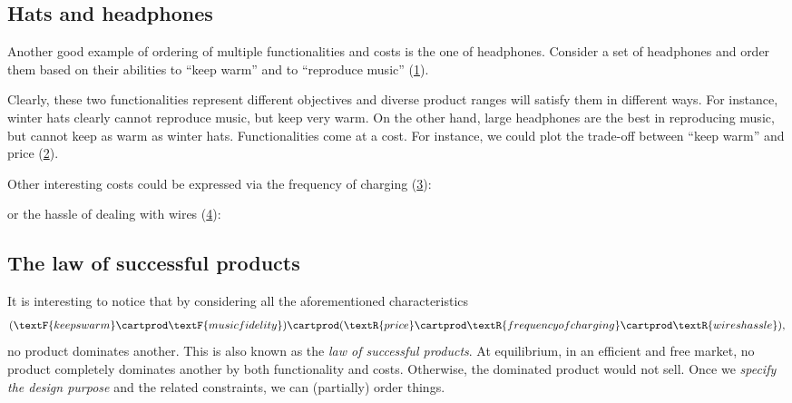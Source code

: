 
\subsection{Hats and headphones}
Another good example of ordering of multiple functionalities and costs is the one of headphones.
Consider a set of headphones and order them based on their abilities to ``keep warm'' and to ``reproduce music'' (\cref{fig:headpho_fun}).

\begin{figure}[h!]
    \centering
    \caption{}
    \label{fig:headpho_fun}
\end{figure}

Clearly, these two functionalities represent different objectives and diverse product ranges will satisfy them in different ways.
For instance, winter hats clearly cannot reproduce music, but keep very warm.
On the other hand, large headphones are the best in reproducing music, but cannot keep as warm as winter hats.
Functionalities come at a cost.
For instance, we could plot the trade-off between ``keep warm'' and price (\cref{fig:headpho_price}).

\begin{figure}[h!]
    \centering
    \caption{}
    \label{fig:headpho_price}
\end{figure}
\vfill
\clearpage

Other interesting costs could be expressed via the frequency of charging (\cref{fig:headpho_charge}):

\begin{figure}[h!
    ]
    \centering
    \caption{}
    \label{fig:headpho_charge}
\end{figure}

or the hassle of dealing with wires (\cref{fig:headpho_wires}):

\begin{figure}[h!]
    \centering
    \caption{}
    \label{fig:headpho_wires}
\end{figure}

\subsection{The law of successful products}
It is interesting to notice that by considering all the aforementioned characteristics
\begin{equation*}
    (\textF{keeps warm}\cartprod \textF{music fidelity})
    \cartprod (\textR{price}\cartprod \textR{frequency of charging}\cartprod \textR{wires hassle}),
\end{equation*}
no product dominates another.
This is also known as the \emph{law of successful products}.
At equilibrium, in an efficient and free market, no product completely dominates another by both functionality and costs.
Otherwise, the dominated product would not sell.
Once we \emph{specify the design purpose} and the related constraints, we can (partially) order things.


